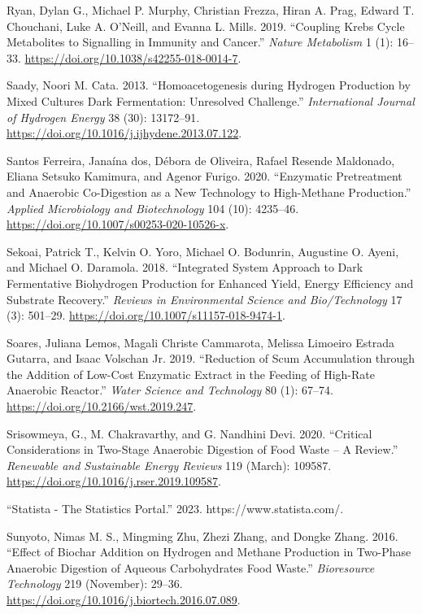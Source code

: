 \documentclass[11pt]{report}
\begin{document}
\begin{hangparas}{1.5em}{1}
\hypertarget{citeproc_bib_item_63}{Ryan, Dylan G., Michael P. Murphy, Christian Frezza, Hiran A. Prag, Edward T. Chouchani, Luke A. O’Neill, and Evanna L. Mills. 2019. “Coupling Krebs Cycle Metabolites to Signalling in Immunity and Cancer.” \textit{Nature Metabolism} 1 (1): 16–33. \url{https://doi.org/10.1038/s42255-018-0014-7}.}

\hypertarget{citeproc_bib_item_64}{Saady, Noori M. Cata. 2013. “Homoacetogenesis during Hydrogen Production by Mixed Cultures Dark Fermentation: Unresolved Challenge.” \textit{International Journal of Hydrogen Energy} 38 (30): 13172–91. \url{https://doi.org/10.1016/j.ijhydene.2013.07.122}.}

\hypertarget{citeproc_bib_item_65}{Santos Ferreira, Janaína dos, Débora de Oliveira, Rafael Resende Maldonado, Eliana Setsuko Kamimura, and Agenor Furigo. 2020. “Enzymatic Pretreatment and Anaerobic Co-Digestion as a New Technology to High-Methane Production.” \textit{Applied Microbiology and Biotechnology} 104 (10): 4235–46. \url{https://doi.org/10.1007/s00253-020-10526-x}.}

\hypertarget{citeproc_bib_item_66}{Sekoai, Patrick T., Kelvin O. Yoro, Michael O. Bodunrin, Augustine O. Ayeni, and Michael O. Daramola. 2018. “Integrated System Approach to Dark Fermentative Biohydrogen Production for Enhanced Yield, Energy Efficiency and Substrate Recovery.” \textit{Reviews in Environmental Science and Bio/Technology} 17 (3): 501–29. \url{https://doi.org/10.1007/s11157-018-9474-1}.}

\hypertarget{citeproc_bib_item_67}{Soares, Juliana Lemos, Magali Christe Cammarota, Melissa Limoeiro Estrada Gutarra, and Isaac Volschan Jr. 2019. “Reduction of Scum Accumulation through the Addition of Low-Cost Enzymatic Extract in the Feeding of High-Rate Anaerobic Reactor.” \textit{Water Science and Technology} 80 (1): 67–74. \url{https://doi.org/10.2166/wst.2019.247}.}

\hypertarget{citeproc_bib_item_68}{Srisowmeya, G., M. Chakravarthy, and G. Nandhini Devi. 2020. “Critical Considerations in Two-Stage Anaerobic Digestion of Food Waste – A Review.” \textit{Renewable and Sustainable Energy Reviews} 119 (March): 109587. \url{https://doi.org/10.1016/j.rser.2019.109587}.}

\hypertarget{citeproc_bib_item_69}{“Statista - The Statistics Portal.” 2023. https://www.statista.com/.}

\hypertarget{citeproc_bib_item_70}{Sunyoto, Nimas M. S., Mingming Zhu, Zhezi Zhang, and Dongke Zhang. 2016. “Effect of Biochar Addition on Hydrogen and Methane Production in Two-Phase Anaerobic Digestion of Aqueous Carbohydrates Food Waste.” \textit{Bioresource Technology} 219 (November): 29–36. \url{https://doi.org/10.1016/j.biortech.2016.07.089}.}


\end{hangparas}
\end{document}
